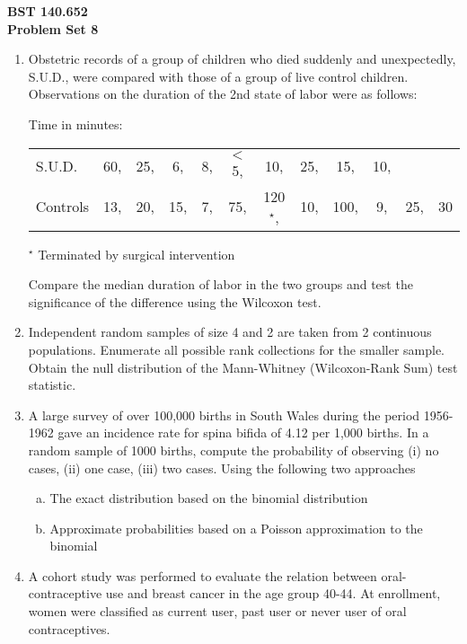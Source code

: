 \documentclass[12pt]{article}
\begin{document}
\noindent
{\bf BST 140.652 \\ Problem Set 8 } \\

\begin{enumerate}[Problem 1.]
\item Obstetric records of a group of children who died suddenly and unexpectedly,
S.U.D., were compared with those of a group of live control children.  Observations
on the duration of the 2nd state of labor were as follows:
\begin{center}
Time in minutes:
\ttfamily
\begin{tabular}{lccccccccccc}
\\ \hline
S.U.D. & 60, & 25, & 6, & 8, & $<$5, & 10, & 25, & 15, & 10, \vspace{+0.25in} \\
Controls & 13, & 20, & 15, & 7, & 75, & 120$^\star$, & 10, & 100, & 9, & 25, & 30
\\ \hline
\end{tabular}
\normalfont
$^\star$ Terminated by surgical intervention
\end{center}
Compare the median duration of labor in the two groups and test the
significance of the difference using the Wilcoxon test.
\item Independent random samples of size 4 and 2 are taken from 2
  continuous populations. Enumerate all possible rank collections for
  the smaller sample.  Obtain the null distribution of the
  Mann-Whitney (Wilcoxon-Rank Sum) test statistic.
\item A large survey of over 100,000 births in South Wales during the period
1956-1962 gave an incidence rate for spina bifida of 4.12 per
1,000 births.  In a random sample of 1000 births, compute the
probability of observing (i) no cases, (ii) one case, (iii) two
cases.  Using the following two approaches
\begin{enumerate}[a.]
\item The exact distribution based on the binomial distribution
\item Approximate probabilities based on a Poisson approximation to the binomial
\end{enumerate}
\item A cohort study was performed to evaluate the relation between
  oral-contraceptive use and breast cancer in the age group 40-44. At
  enrollment, women were classified as current user, past user or
  never user of oral contraceptives.
\begin{center}

\end{center}
\end{enumerate}
\end{document}

